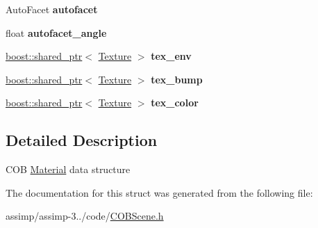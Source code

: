 \begin{DoxyCompactItemize}
\item 
\hypertarget{struct_assimp_1_1_c_o_b_1_1_material_a0749f0a2b0cf0cad9515e87d223fb6fe}{Auto\+Facet {\bfseries autofacet}}\label{struct_assimp_1_1_c_o_b_1_1_material_a0749f0a2b0cf0cad9515e87d223fb6fe}

\item 
\hypertarget{struct_assimp_1_1_c_o_b_1_1_material_a439b2e22e2aa0275e2e44352c2f35fb9}{float {\bfseries autofacet\+\_\+angle}}\label{struct_assimp_1_1_c_o_b_1_1_material_a439b2e22e2aa0275e2e44352c2f35fb9}

\item 
\hypertarget{struct_assimp_1_1_c_o_b_1_1_material_a9f8fdec7247a53cc45e491f4174267e1}{\hyperlink{classboost_1_1shared__ptr}{boost\+::shared\+\_\+ptr}$<$ \hyperlink{struct_assimp_1_1_c_o_b_1_1_texture}{Texture} $>$ {\bfseries tex\+\_\+env}}\label{struct_assimp_1_1_c_o_b_1_1_material_a9f8fdec7247a53cc45e491f4174267e1}

\item 
\hypertarget{struct_assimp_1_1_c_o_b_1_1_material_a542237dcb1a85cecb1735e667eabbde5}{\hyperlink{classboost_1_1shared__ptr}{boost\+::shared\+\_\+ptr}$<$ \hyperlink{struct_assimp_1_1_c_o_b_1_1_texture}{Texture} $>$ {\bfseries tex\+\_\+bump}}\label{struct_assimp_1_1_c_o_b_1_1_material_a542237dcb1a85cecb1735e667eabbde5}

\item 
\hypertarget{struct_assimp_1_1_c_o_b_1_1_material_ab568cc1926eadd214049e3d77b3542df}{\hyperlink{classboost_1_1shared__ptr}{boost\+::shared\+\_\+ptr}$<$ \hyperlink{struct_assimp_1_1_c_o_b_1_1_texture}{Texture} $>$ {\bfseries tex\+\_\+color}}\label{struct_assimp_1_1_c_o_b_1_1_material_ab568cc1926eadd214049e3d77b3542df}

\end{DoxyCompactItemize}


\subsection{Detailed Description}
C\+O\+B \hyperlink{struct_assimp_1_1_c_o_b_1_1_material}{Material} data structure 

The documentation for this struct was generated from the following file\+:\begin{DoxyCompactItemize}
\item 
assimp/assimp-\/3../code/\hyperlink{_c_o_b_scene_8h}{C\+O\+B\+Scene.\+h}\end{DoxyCompactItemize}
